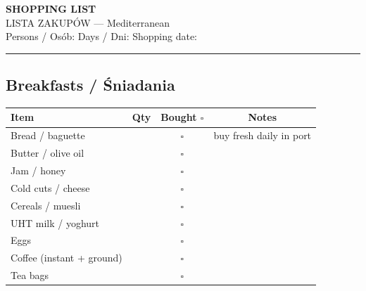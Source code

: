 \documentclass[a4paper,11pt]{article}
\begin{document}

\begin{center}
    {\Large\bfseries\color{pzzblue} SHOPPING LIST}\\
    {\large LISTA ZAKUPÓW — Mediterranean}\\[4pt]
    {\small Persons / Osób: \field{1.5cm} \quad Days / Dni: \field{1.5cm} \quad Shopping date: \field{3cm}}
\end{center}

\vspace{0.3cm}
\noindent\rule{\linewidth}{1pt}

\subsection*{Breakfasts / Śniadania}
\begin{tabularx}{\linewidth}{|X|c|c|c|}
\hline
\textbf{Item} & \textbf{Qty} & \textbf{Bought \(\square\)} & \textbf{Notes} \\
\hline
Bread / baguette & & \(\square\) & buy fresh daily in port \\[4pt]\hline
Butter / olive oil & & \(\square\) & \\[4pt]\hline
Jam / honey & & \(\square\) & \\[4pt]\hline
Cold cuts / cheese & & \(\square\) & \\[4pt]\hline
Cereals / muesli & & \(\square\) & \\[4pt]\hline
UHT milk / yoghurt & & \(\square\) & \\[4pt]\hline
Eggs & & \(\square\) & \\[4pt]\hline
Coffee (instant + ground) & & \(\square\) & \\[4pt]\hline
Tea bags & & \(\square\) & \\[4pt]\hline
\end{tabularx}

\vspace{0.3cm}
\end{document}
